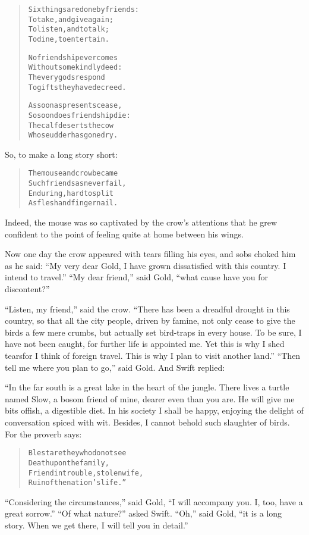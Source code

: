\documentclass[article, twoside, 14pt]{memoir}
\renewenvironment{verbatim}{%
\begin{quote}%
\vskip -10pt%
\begin{alltt}\normalfont\large}{\end{alltt}%
\end{quote}%
\vskip -10pt
} %
\begin{document}
\begin{verbatim}
Six things are done by friends:
    To take, and give again;
To listen, and to talk;
    To dine, to entertain.

No friendship ever comes
    Without some kindly deed:
The very gods respond
    To gifts they have decreed.

As soon as presents cease,
    So soon does friendship die:
The calf deserts the cow
    Whose udder has gone dry.
\end{verbatim}
So, to make a long story short:

\begin{verbatim}
The mouse and crow became
    Such friends as never fail,
Enduring, hard to split
    As flesh and finger nail.
\end{verbatim}
Indeed, the mouse was so captivated by the crow's attentions that
he grew confident to the point of feeling quite at home between his
wings.

Now one day the crow appeared with tears filling his eyes, and sobs
choked him as he said:
``My very dear Gold, I have grown dissatisfied with this country. I intend to travel.''
``My dear friend,'' said Gold,
``what cause have you for discontent?''

``Listen, my friend,'' said the crow.
``There has been a dreadful drought in this country, so that all the city people, driven by famine, not only cease to give the birds a few mere crumbs, but actually set bird-traps in every house. To be sure, I have not been caught, for further life is appointed me. Yet this is why I shed tears{\textemdash}for I think of foreign travel. This is why I plan to visit another land.''
``Then tell me where you plan to go,'' said Gold. And Swift
replied:

“In the far south is a great lake in the heart of the jungle. There
lives a turtle named Slow, a bosom friend of mine, dearer even than
you are. He will give me bits offish, a digestible diet. In his
society I shall be happy, enjoying the delight of conversation
spiced with wit. Besides, I cannot behold such slaughter of birds.
For the proverb says:

\begin{verbatim}
Blest are they who do not see
Death upon the family,
Friend in trouble, stolen wife,
Ruin of the nation's life.”
\end{verbatim}
``Considering the circumstances,'' said Gold,
``I will accompany you. I, too, have a great sorrow.''
``Of what nature?'' asked Swift. ``Oh,'' said Gold,
``it is a long story. When we get there, I will tell you in detail.''
\end{document}
